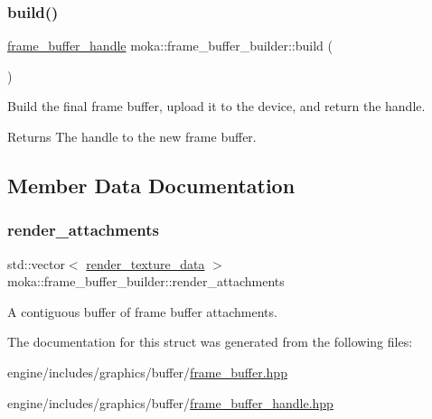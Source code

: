 \mbox{\label{structmoka_1_1frame__buffer__builder_a4923409d41757735101a7dd636286693}} 
\subsubsection{\texorpdfstring{build()}{build()}\hspace{0.1cm}{\footnotesize\ttfamily [2/2]}}
{\footnotesize\ttfamily \mbox{\hyperlink{structmoka_1_1frame__buffer__handle}{frame\+\_\+buffer\+\_\+handle}} moka\+::frame\+\_\+buffer\+\_\+builder\+::build (\begin{DoxyParamCaption}{ }\end{DoxyParamCaption})}



Build the final frame buffer, upload it to the device, and return the handle. 

\begin{DoxyReturn}{Returns}
The handle to the new frame buffer. 
\end{DoxyReturn}


\subsection{Member Data Documentation}
\mbox{\label{structmoka_1_1frame__buffer__builder_a5494dab8e049d0a05c5e434f919dbbd6}} 
\subsubsection{\texorpdfstring{render\_attachments}{render\_attachments}}
{\footnotesize\ttfamily std\+::vector$<$ \mbox{\hyperlink{structmoka_1_1render__texture__data}{render\+\_\+texture\+\_\+data}} $>$ moka\+::frame\+\_\+buffer\+\_\+builder\+::render\+\_\+attachments}

A contiguous buffer of frame buffer attachments. 

The documentation for this struct was generated from the following files\+:\begin{DoxyCompactItemize}
\item 
engine/includes/graphics/buffer/\mbox{\hyperlink{frame__buffer_8hpp}{frame\+\_\+buffer.\+hpp}}\item 
engine/includes/graphics/buffer/\mbox{\hyperlink{frame__buffer__handle_8hpp}{frame\+\_\+buffer\+\_\+handle.\+hpp}}\end{DoxyCompactItemize}
